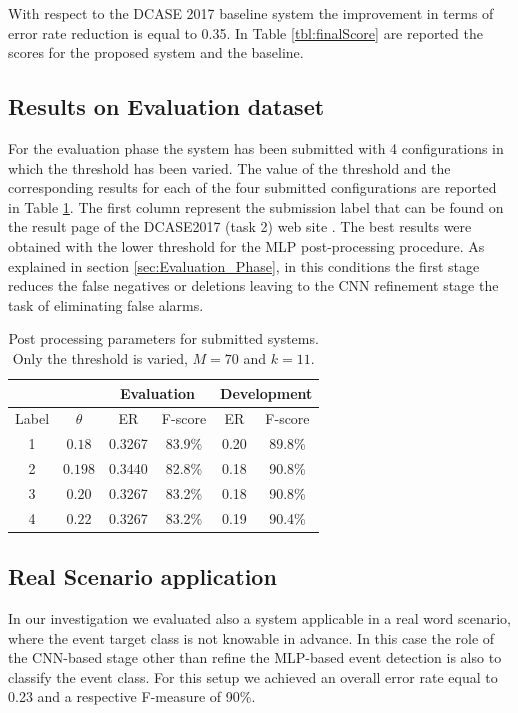 \documentclass{article}
\begin{document}
\begin{sloppy}
With respect to the DCASE 2017 baseline system the improvement in terms of error rate reduction is equal to 0.35. In Table \ref{tbl:finalScore} are reported the scores for the proposed system and the baseline.

\subsection{Results on Evaluation dataset}
For the evaluation phase the system has been submitted with 4 configurations in which the threshold has been varied. The value of the threshold and the corresponding results for each of the four submitted configurations are reported in Table \ref{tbl:submitted-params}. The first column represent the submission label that can be found on the result page of the DCASE2017 (task 2) web site \cite{dcase2017webResultsTask2}.
The best results were obtained with the lower threshold for the MLP post-processing procedure. As explained in section \ref{sec:Evaluation_Phase}, in this conditions the first stage reduces the false negatives or deletions leaving to the CNN refinement stage the task of eliminating false alarms.

\begin{table}[t]
	\caption{Post processing parameters for submitted systems. Only the threshold is varied, $M = 70$ and $k=11$.}
	\label{tbl:submitted-params}
	\centering
	\footnotesize
	\begin{tabular} {| c | c | c | c | c | c | }
		\hline
 		& & \multicolumn{2}{c|}{Evaluation}&\multicolumn{2}{c|}{Development}\\
 		\hline 
		Label &$\theta$    & ER &  F-score & ER &  F-score\\  
		\hline

		1 &$0.18$  &0.3267&83.9\% &0.20&89.8\% \\
		\hline                                     
		2 &$0.198$ &0.3440&	82.8\%&0.18&90.8\%  \\
		\hline
		3 &$0.20$  &0.3267 &	83.2\% &	0.18&	90.8\%\\
		\hline   
		4 &$0.22$ &0.3267	&83.2\% &	0.19&	90.4\%\\
		\hline                                       
	\end{tabular}
\end{table}


\subsection{Real Scenario application}
In our investigation we evaluated also a system applicable in a real word scenario, where the event target class is not knowable in advance. In this case the role of the CNN-based stage other than refine the MLP-based event detection is also to classify the event class. For this setup we achieved an overall error rate equal to 0.23 and a respective F-measure of 90\%.


\end{sloppy}
\end{document}
